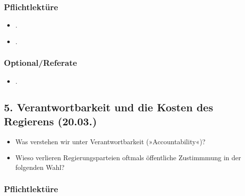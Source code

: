 \documentclass[abstract=on,parskip=full,headings=standardclasses,fontsize=11pt,paper=a4]{scrartcl}
\begin{document}
\subsubsection*{Pflichtlektüre}
\begin{itemize}
\item {}.
\item {}.
\end{itemize}


\subsubsection*{Optional/Referate}
\begin{itemize}
\item {}.
\end{itemize}


%




\subsection{5. Verantwortbarkeit und die Kosten des Regierens (20.03.)}

\begin{itemize}
\renewcommand\labelitemi{--}
\item Was verstehen wir unter Verantwortbarkeit (»Accountability«)?
\item Wieso verlieren Regierungsparteien oftmals öffentliche Zustimmmung in der folgenden Wahl?
\end{itemize}

\subsubsection*{Pflichtlektüre}
\end{document}
